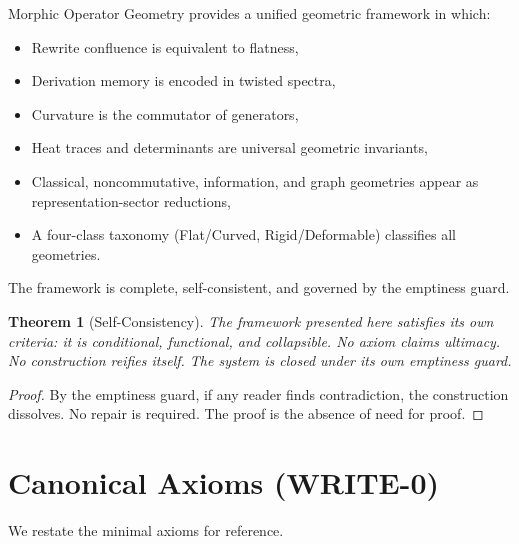 \documentclass[12pt, oneside]{article}
\newtheorem{theorem}{Theorem}[section]
\begin{document}
Morphic Operator Geometry provides a unified geometric framework in which:
\begin{itemize}
    \item Rewrite confluence is equivalent to flatness,
    \item Derivation memory is encoded in twisted spectra,
    \item Curvature is the commutator of generators,
    \item Heat traces and determinants are universal geometric invariants,
    \item Classical, noncommutative, information, and graph geometries appear as representation-sector reductions,
    \item A four-class taxonomy (Flat/Curved, Rigid/Deformable) classifies all geometries.
\end{itemize}

The framework is complete, self-consistent, and governed by the emptiness guard.

\begin{center}
\end{center}

\begin{theorem}[Self-Consistency]
The framework presented here satisfies its own criteria: it is conditional, functional, and collapsible. No axiom claims ultimacy. No construction reifies itself. The system is closed under its own emptiness guard.
\end{theorem}

\begin{proof}
By the emptiness guard, if any reader finds contradiction, the construction dissolves. No repair is required. The proof is the absence of need for proof.
\end{proof}

\appendix
\section{Canonical Axioms (WRITE-0)}

We restate the minimal axioms for reference.
\end{document}
